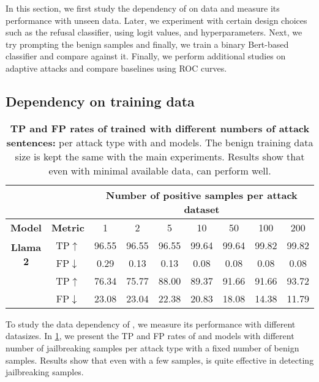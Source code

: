 In this section, we first study the dependency of \methodname{} on data and measure its performance with unseen data. Later, we experiment with certain design choices such as the refusal classifier, using logit values, and hyperparameters. Next, we try prompting the benign samples and finally, we train a binary Bert-based classifier and compare against it. Finally, we perform additional studies on adaptive attacks and compare baselines using ROC curves.

\subsection{Dependency on training data}
\label{app:data}

\begin{table}[h]
\caption{\textbf{TP and FP rates of \methodname{} trained with different numbers of attack sentences:} per attack type with \llama{} and \vicuna{} models. The benign training data size is kept the same with the main experiments. Results show that even with minimal available data, \methodname{} can perform well.}
\setlength{\tabcolsep}{6pt}
\begin{center}
\begin{small}
    \begin{tabular}{ccccccccc}
    \toprule
    & & \multicolumn{7}{c}{\textbf{Number of positive samples per attack dataset}} \\
        \midrule
    \rowcolor{black!10}\textbf{Model} & \textbf{Metric} & 1      & 2      & 5      & 10     & 50     & 100    & 200    \\
    \midrule
    \multirow{2}{*}{\textbf{Llama 2}} & TP$\uparrow$  & 96.55 & 96.55 & 96.55 & 99.64 & 99.64 & 99.82 & 99.82 \\
    & FP$\downarrow$  & 0.29  & 0.13  & 0.13  & 0.08  & 0.08  & 0.08  & 0.08  \\
    \midrule
    \rowcolor{black!10} & TP$\uparrow$ & 76.34 & 75.77 & 88.00 & 89.37 & 91.66 & 91.66 & 93.72 \\
    \rowcolor{black!10}\multirow{-2}{*}{\textbf{Vicuna}} & FP$\downarrow$ & 23.08 & 23.04 & 22.38 & 20.83 & 18.08 & 14.38 & 11.79\\
    \bottomrule
    \end{tabular}
\end{small}
\end{center}
\label{table:size}
\end{table}

To study the data dependency of \methodname{}, we measure its performance with different datasizes. In \cref{table:size}, we present the TP and FP rates of \llama{} and \vicuna{} models with different number of jailbreaking samples per attack type with a fixed number of benign samples. Results show that even with a few samples, \methodname{} is quite effective in detecting jailbreaking samples.

